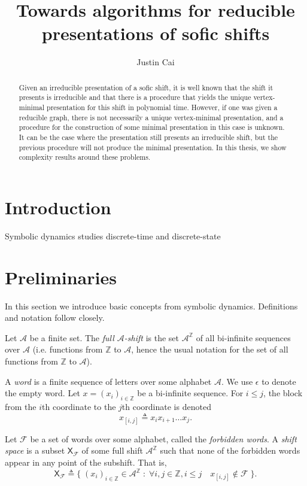 \documentclass[hidelinks]{article}
\title{Towards algorithms for reducible presentations of sofic shifts}
\author{Justin Cai}
\newcommand{\Ac}{\mathcal{A}}  %
\newcommand{\Fc}{\mathcal{F}}
\newcommand{\shift}[1]{\mathsf{X}_{#1}}
\newcommand{\term}[1]{\textit{#1}}
\theoremstyle{definition}
\begin{document}
\maketitle

\begin{abstract}
    Given an irreducible presentation of a sofic shift, it is well known that the 
    shift it presents is irreducible and that there is a 
    procedure that yields the unique vertex-minimal presentation for
    this shift in polynomial time. However, if one was given a reducible 
    graph, there is not necessarily a unique vertex-minimal presentation, and 
    a procedure for the construction of some minimal presentation in 
    this case is unknown. It can be the case where the presentation still presents 
    an irreducible shift, but the previous procedure will not produce the 
    minimal presentation. In this thesis, we show complexity results around 
    these problems.
\end{abstract}

\section{Introduction}

Symbolic dynamics studies discrete-time and discrete-state 

\section{Preliminaries}

In this section we introduce basic concepts from symbolic dynamics. 
Definitions and notation follow \cite{lind1995introduction} closely.

\begin{definition}
    Let \(\Ac\) be a finite set. The \term{full \(\Ac\)-shift} is the set \(\Ac^\mathbb{Z}\) of all 
    bi-infinite sequences over \(\Ac\) (i.e. functions from \(\mathbb{Z}\) to \(\Ac\), hence the 
    usual notation for the set of all functions from \(\mathbb{Z}\) to \(\Ac\)).
\end{definition}

A \term{word} is a finite sequence of letters over some alphabet \(\Ac\). We use 
\(\epsilon\) to denote the empty word.
Let \(x=(x_i)_{i \in \mathbb{Z}}\) be a bi-infinite sequence. For \(i \leq j\), the block from the 
\(i\)th coordinate to the \(j\)th coordinate is denoted \[x_{[i,j]} \triangleq x_i x_{i+1} \dots x_{j}.\]

\begin{definition}
    Let \(\Fc\) be a set of words over some alphabet, called the \term{forbidden words}.
    A \term{shift space} is a subset \(\shift{\Fc}\)
    of some full shift \(\Ac^\mathbb{Z}\) such that none of the forbidden words appear in any point of the subshift.
    That is,
    \[\shift{\Fc} \triangleq \Big\{ \; (x_i)_{i \in \mathbb{Z}} \in \Ac^\mathbb{Z} \; : \; \forall i, j \in \mathbb{Z}, i\leq j \quad  x_{[i,j]} \notin \Fc \; \Big\}.\]
\end{definition}
\end{document}
